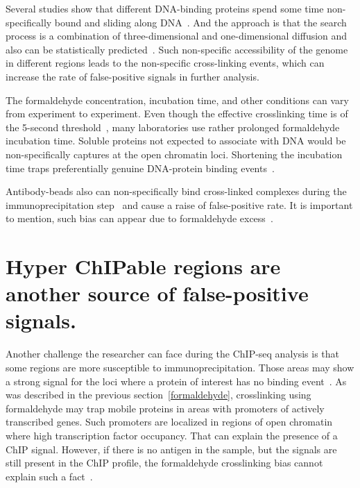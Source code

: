 Several studies show that different DNA-binding proteins spend some time non-specifically bound and sliding along DNA~\cite{slutsky2004kinetics,mirny2010nucleosome,cherstvy2008protein,hu2006proteins,sheinman2009effects}.
And the approach is that the search process is a combination of three-dimensional and one-dimensional diffusion and also can be statistically predicted~\cite{sela2011dna}.
Such non-specific accessibility of the genome in different regions leads to the non-specific cross-linking events, which can increase the rate of false-positive signals in further analysis.

The formaldehyde concentration, incubation time, and other conditions can vary from experiment to experiment. 
Even though the effective crosslinking time is of the 5-second threshold~\cite{schmiedeberg2009temporal}, many laboratories use rather prolonged formaldehyde incubation time.
Soluble proteins not expected to associate with DNA would be non-specifically captures at the open chromatin loci. Shortening the incubation time traps preferentially genuine DNA-protein binding events~\cite{baranello2016chip}.

Antibody-beads also can non-specifically bind cross-linked complexes during the immunoprecipitation step~\cite{zhu2014fast} and cause a raise of false-positive rate.
It is important to mention, such bias can appear due to formaldehyde excess~\cite{hanson2018using}.

\section{Hyper ChIPable regions are another source of false-positive signals.}

Another challenge the researcher can face during the ChIP-seq analysis is that some regions are more susceptible to immunoprecipitation. 
Those areas may show a strong signal for the loci where a protein of interest has no binding event~\cite{teytelman2013highly}.
As was described in the previous section~\ref{formaldehyde}, crosslinking using formaldehyde may trap mobile proteins in areas with promoters of actively transcribed genes. 
Such promoters are localized in regions of open chromatin where high transcription factor occupancy.  
That can explain the presence of a ChIP signal. 
However, if there is no antigen in the sample, but the signals are still present in the ChIP profile, the formaldehyde crosslinking bias cannot explain such a fact~\cite{jain2015active}.

